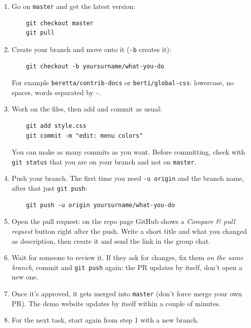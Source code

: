 \documentclass[11pt, a4paper]{article}
\begin{document}
\begin{enumerate}
  \item Go on \texttt{master} and get the latest version:
    \vspace{-0.8em}
    \begin{verbatim}
    git checkout master
    git pull
    \end{verbatim}
    \vspace{-1.6em}

  \item Create your branch and move onto it (\texttt{-b} creates it):
    \vspace{-0.8em}
    \begin{verbatim}
    git checkout -b yoursurname/what-you-do
    \end{verbatim}
    \vspace{-1.6em}
    For example \texttt{beretta/contrib-docs} or \texttt{berti/global-css}: lowercase, no spaces, words separated by \texttt{-}.
  
  \item Work on the files, then add and commit as usual:
    \vspace{-0.8em}
    \begin{verbatim}
    git add style.css
    git commit -m "edit: menu colors"
    \end{verbatim}
    \vspace{-1.6em}
    You can make as many commits as you want. Before committing, check with \texttt{git status} that you are on your branch and not on \texttt{master}.
  
  \item Push your branch. The first time you need \texttt{-u origin} and the branch name, after that just \texttt{git push}:
    \vspace{-0.8em}
    \begin{verbatim}
    git push -u origin yoursurname/what-you-do
    \end{verbatim}
    \vspace{-1.6em}
 
  \item Open the pull request: on the repo page GitHub shows a \emph{Compare \& pull request} button right after the push. Write a short title and what you changed as description, then create it and send the link in the group chat.
 
  \item Wait for someone to review it. If they ask for changes, fix them \emph{on the same branch}, commit and \texttt{git push} again: the PR updates by itself, don't open a new one.
 
  \item Once it's approved, it gets merged into \texttt{master} (don't force merge your own PR). The demo website updates by itself within a couple of minutes.
 
  \item For the next task, start again from step 1 with a new branch.
\end{enumerate}
\end{document}
